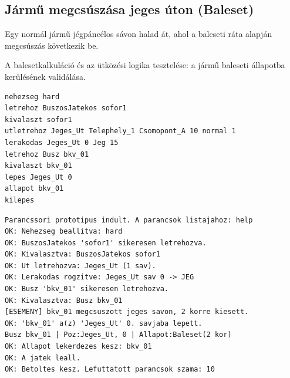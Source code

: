 \subsection{Jármű megcsúszása jeges úton (Baleset)}
\begin{test-case-description}
    Egy normál jármű jégpáncélos sávon halad át, ahol a baleseti ráta alapján megcsúszás következik be.
\end{test-case-description}
\begin{test-case-function}
    A balesetkalkuláció és az ütközési logika tesztelése: a jármű baleseti állapotba kerülésének validálása.
\end{test-case-function}
\begin{test-case-input}
\begin{verbatim}
nehezseg hard
letrehoz BuszosJatekos sofor1
kivalaszt sofor1
utletrehoz Jeges_Ut Telephely_1 Csomopont_A 10 normal 1
lerakodas Jeges_Ut 0 Jeg 15
letrehoz Busz bkv_01
kivalaszt bkv_01
lepes Jeges_Ut 0
allapot bkv_01
kilepes
\end{verbatim}
\end{test-case-input}
\begin{test-case-output}
\begin{verbatim}
Parancssori prototipus indult. A parancsok listajahoz: help
OK: Nehezseg beallitva: hard
OK: BuszosJatekos 'sofor1' sikeresen letrehozva.
OK: Kivalasztva: BuszosJatekos sofor1
OK: Ut letrehozva: Jeges_Ut (1 sav).
OK: Lerakodas rogzitve: Jeges_Ut sav 0 -> JEG
OK: Busz 'bkv_01' sikeresen letrehozva.
OK: Kivalasztva: Busz bkv_01
[ESEMENY] bkv_01 megcsuszott jeges savon, 2 korre kiesett.
OK: 'bkv_01' a(z) 'Jeges_Ut' 0. savjaba lepett.
Busz bkv_01 | Poz:Jeges_Ut, 0 | Allapot:Baleset(2 kor)
OK: Allapot lekerdezes kesz: bkv_01
OK: A jatek leall.
OK: Betoltes kesz. Lefuttatott parancsok szama: 10
\end{verbatim}
\end{test-case-output}

